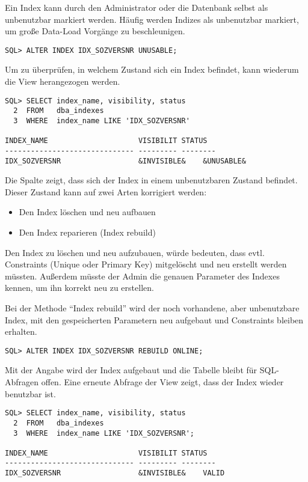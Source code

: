           Ein Index kann durch den Administrator oder die Datenbank selbst als unbenutzbar markiert werden. Häufig werden Indizes als unbenutzbar markiert, um große Data-Load Vorgänge zu beschleunigen.
          \begin{lstlisting}[caption={Einen Index als unbenutzbar markieren},label=admin329,language=oracle_sql]
SQL> ALTER INDEX IDX_SOZVERSNR UNUSABLE;
          \end{lstlisting}
          Um zu überprüfen, in welchem Zustand sich ein Index befindet, kann wiederum die View  herangezogen werden.
          \begin{lstlisting}[caption={Prüfen, ob ein Index nutzbar ist},label=admin330,language=oracle_sql]
SQL> SELECT index_name, visibility, status
  2  FROM   dba_indexes
  3  WHERE  index_name LIKE 'IDX_SOZVERSNR'

INDEX_NAME                     VISIBILIT STATUS
------------------------------ --------- --------
IDX_SOZVERSNR                  &INVISIBLE&    &UNUSABLE&
          \end{lstlisting}
          Die Spalte  zeigt, dass sich der Index in einem unbenutzbaren Zustand befindet. Dieser Zustand kann auf zwei Arten korrigiert werden:
          \begin{itemize}
            \item Den Index löschen und neu aufbauen
            \item Den Index reparieren (Index rebuild)
          \end{itemize}
          Den Index zu löschen und neu aufzubauen, würde bedeuten, dass evtl. Constraints (Unique oder Primary Key) mitgelöscht und neu erstellt werden müssten. Außerdem müsste der Admin die genauen Parameter des Indexes kennen, um ihn korrekt neu zu erstellen.

          Bei der Methode \enquote{Index rebuild} wird der noch vorhandene, aber unbenutzbare Index, mit den gespeicherten Parametern neu aufgebaut und Constraints bleiben erhalten.
          \begin{lstlisting}[caption={Einen Index reparieren},label=admin331,language=oracle_sql]
SQL> ALTER INDEX IDX_SOZVERSNR REBUILD ONLINE;
          \end{lstlisting}
          Mit der Angabe  wird der Index aufgebaut und die Tabelle bleibt für SQL-Abfragen offen. Eine erneute Abfrage der View  zeigt, dass der Index wieder benutzbar ist.
          \begin{lstlisting}[caption={Der Index ist wieder benutzbar},label=admin332,language=oracle_sql]
SQL> SELECT index_name, visibility, status
  2  FROM   dba_indexes
  3  WHERE  index_name LIKE 'IDX_SOZVERSNR';

INDEX_NAME                     VISIBILIT STATUS
------------------------------ --------- --------
IDX_SOZVERSNR                  &INVISIBLE&    VALID
          \end{lstlisting}
